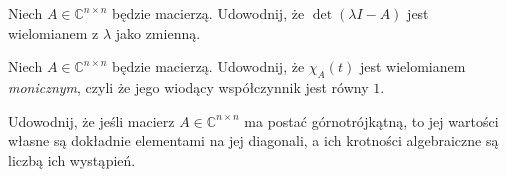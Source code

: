 \begin{exercise}\label{ex:characteristic-eq-is-poly}
	Niech $A \in \mathbb{C}^{n \times n}$ będzie macierzą.
	Udowodnij,
		że $\det(\lambda I - A)$ jest wielomianem z $\lambda$ jako zmienną.
\end{exercise}

\begin{exercise}
	Niech $A \in \mathbb{C}^{n \times n}$ będzie macierzą.
	Udowodnij,
		że $\chi_A(t)$ jest wielomianem \textit{monicznym},
		czyli że jego wiodący współczynnik jest równy $1$.
\end{exercise}

\begin{exercise}\label{ex:upper-triangular-eigenvalues}
	Udowodnij, że jeśli macierz $A \in \mathbb{C}^{n \times n}$ ma postać górnotrójkątną,
		to jej wartości własne są dokładnie elementami na jej diagonali,
		a ich krotności algebraiczne są liczbą ich wystąpień.
\end{exercise}
